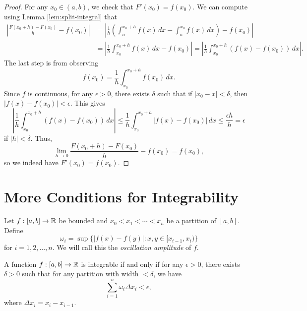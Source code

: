 \begin{proof}
  For any $x_0 \in (a, b)$, we check that
  $F'(x_0) = f(x_0)$. We can compute using Lemma
  \ref{lem:split-integral} that
  \begin{align*}
    \left| \frac{F(x_0 + h) - F(x_0)}{h} - f(x_0) \right|
    &= \left| \frac{1}{h} \left( \int_a^{x_0 + h} f(x)\, dx - \int_a^{x_0} f(x)\, dx \right) - f(x_0) \right| \\
    &= \left| \frac{1}{h} \int_{x_0}^{x_0 + h} f(x)\, dx - f(x_0) \right|
    = \left| \frac{1}{h} \int_{x_0}^{x_0 + h} (f(x) - f(x_0))\, dx \right|.
  \end{align*}
  The last step is from observing
  \[
    f(x_0) = \frac{1}{h} \int_{x_0}^{x_0 + h} f(x_0)\, dx.
  \]
  Since $f$ is continuous, for any $\epsilon > 0$, there
  exists $\delta$
  such that if $|x_0 - x| < \delta$, then
  $|f(x) - f(x_0)| < \epsilon$. This gives
  \[
    \left| \frac{1}{h} \int_{x_0}^{x_0 + h} (f(x) - f(x_0))\, dx \right|
    \le \frac{1}{h} \int_{x_0}^{x_0 + h} |f(x) - f(x_0)|\, dx
    \le \frac{\epsilon h}{h} = \epsilon
  \]
  if $|h| < \delta$. Thus,
  \[
    \lim_{h \to 0} \frac{F(x_0 + h) - F(x_0)}{h} - f(x_0) = f(x_0),
  \]
  so we indeed have $F'(x_0) = f(x_0)$.
\end{proof}

\section{More Conditions for Integrability}
\begin{definition}
  Let $f : [a, b] \to \mathbb{R}$ be bounded and
  $x_0 < x_1 < \cdots < x_n$ be a partition of $[a, b]$.
  Define
  \[
    \omega_i = \sup\{|f(x) - f(y)| : x, y \in [x_{i - 1}, x_i)\}
  \]
  for $i = 1, 2, \dots, n$. We will call this
  the \emph{oscillation amplitude} of $f$.
\end{definition}

\begin{theorem}
  A function $f : [a, b] \to \mathbb{R}$ is integrable if and only
  if for any $\epsilon > 0$, there exists $\delta > 0$
  such that for any partition with width $< \delta$,
  we have
  \[
    \sum_{i = 1}^n \omega_i \Delta x_i < \epsilon,
  \]
  where $\Delta x_i = x_i - x_{i - 1}$.
\end{theorem}

